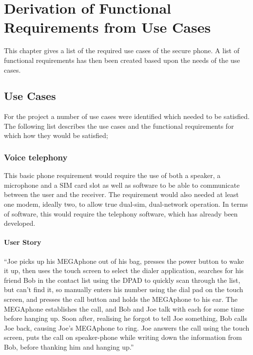 \chapter{Derivation of Functional Requirements from Use Cases} %

\label{Chapter3} %

This chapter gives a list of the required use cases of the secure phone. A list of functional requirements has then been created based upon the needs of the use cases. 

\section{Use Cases}

	For the project a number of use cases were identified which needed to be satisfied. The following list describes the use cases and the functional requirements for which how they would be satisfied;

        
\subsection{Voice telephony}
	This basic phone requirement would require the use of both a speaker, a microphone and a SIM card slot as well as software to be able to communicate between the user and the receiver. The requirement would also needed at least one modem, ideally two, to allow true dual-sim, dual-network operation. In terms of software, this would require the telephony software, which has already been developed.\\
        \subsubsection{User Story}
        ``Joe picks up his MEGAphone out of his bag, presses the power button to wake it up, then uses the touch screen to select the dialer application, searches for his friend Bob in the contact list using the DPAD to quickly scan through the list, but can't find it, so manually enters his number using the dial pad on the touch screen, and presses the call button and holds the MEGAphone to his ear.  The MEGAphone establishes the call, and Bob and Joe talk with each for some time before hanging up.  Soon after, realising he forgot to tell Joe something, Bob calls Joe back, causing Joe's MEGAphone to ring.  Joe answers the call using the touch screen, puts the call on speaker-phone while writing down the information from Bob, before thanking him and hanging up.''
